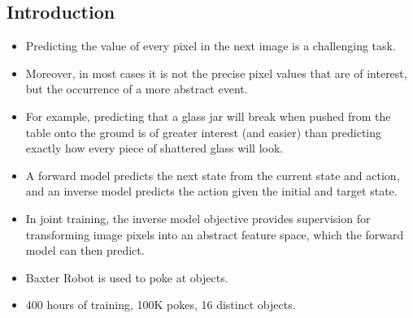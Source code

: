 \documentclass{article}
\begin{document}
    \subsection{Introduction}\label{subsec:Learning_to_Poke_by_Poking_Experiential_Learning_of_Intuitive_Physics_(NIPS_2016):introduction}
    \begin{itemize}
        \item Predicting the value of every pixel in the next image is a challenging task.
        \item Moreover, in most cases it is not the precise pixel values that are of interest, but the occurrence of a more abstract event.
        \item For example, predicting that a glass jar will break when pushed from the table onto the ground is of greater interest (and easier) than predicting exactly how every piece of shattered glass will look.
        \item A forward model predicts the next state from the current state and action, and an inverse model predicts the action given the initial and target state.
        \item In joint training, the inverse model objective provides supervision for transforming image pixels into an abstract feature space, which the forward model can then predict.
        \item Baxter Robot is used to poke at objects.
        \item 400 hours of training, 100K pokes, 16 distinct objects.
    \end{itemize}
\end{document}
